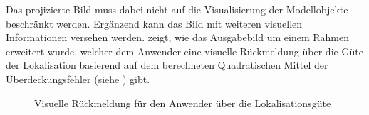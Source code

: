 Das projizierte Bild muss dabei nicht auf die Visualisierung der Modellobjekte beschränkt werden. Ergänzend kann das Bild mit weiteren visuellen Informationen versehen werden.  zeigt, wie das Ausgabebild um einem Rahmen erweitert wurde, welcher dem Anwender eine visuelle Rückmeldung über die Güte der Lokalisation basierend auf dem berechneten Quadratischen Mittel der Überdeckungsfehler (siehe ) gibt.

\prever{
}

\begin{figure}[!ht]
	\begin{center}
	\hspace{5mm}
	\caption{Visuelle Rückmeldung für den Anwender über die Lokalisationsgüte}
	\label{fig.proj_rms}
	\end{center}
\end{figure}

\prever{
}